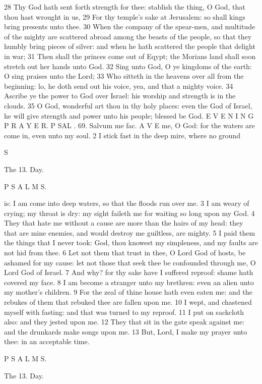 28 Thy God hath sent forth strength for thee: stablish the thing, O God, that thou hast wrought in us, 29 For thy temple’s sake at Jerusalem: so shall kings bring presents unto thee. 30 When the company of the spear-men, and multitude of the mighty are scattered abroad among the beasts of the people, so that they humbly bring pieces of silver: and when he hath scattered the people that delight in war; 31 Then shall the princes come out of Eqypt; the Morians land shall soon stretch out her hands unto God. 32 Sing unto God, O ye kingdoms of the earth: O sing praises unto the Lord; 33 Who sitteth in the heavens over all from the beginning: lo, he doth send out his voice, yea, and that a mighty voice. 34 Ascribe ye the power to God over Israel: his worship and strength is in the clouds. 35 O God, wonderful art thou in thy holy places: even the God of Israel, he will give strength and power unto his people; blessed be God. E V E N I N G P R A Y E R. P SAL . 69. Salvum me fac. A V E me, O God: for the waters are come in, even unto my soul. 2 I stick fast in the deep mire, where no ground

S

The 13. Day.

P S A L M S.

is: I am come into deep waters, so that the floods run over me. 3 I am weary of crying; my throat is dry: my sight faileth me for waiting so long upon my God. 4 They that hate me without a cause are more than the hairs of my head: they that are mine enemies, and would destroy me guiltless, are mighty. 5 I paid them the things that I never took: God, thou knowest my simpleness, and my faults are not hid from thee. 6 Let not them that trust in thee, O Lord God of hosts, be ashamed for my cause: let not those that seek thee be confounded through me, O Lord God of Israel. 7 And why? for thy sake have I suffered reproof: shame hath covered my face. 8 I am become a stranger unto my brethren: even an alien unto my mother’s children. 9 For the zeal of thine house hath even eaten me: and the rebukes of them that rebuked thee are fallen upon me. 10 I wept, and chastened myself with fasting: and that was turned to my reproof. 11 I put on sackcloth also: and they jested upon me. 12 They that sit in the gate speak against me: and the drunkards make songs upon me. 13 But, Lord, I make my prayer unto thee: in an acceptable time.

P S A L M S.

The 13. Day.

